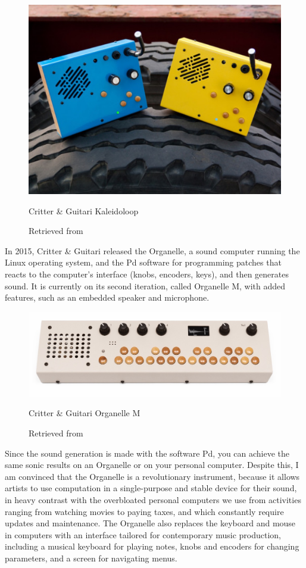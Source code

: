 \begin{figure}[ht]
  \centering
  \includegraphics[width=0.75\linewidth,height=0.25\textheight,keepaspectratio]{images/critter-and-guitari-kaleidoloop.jpg}
  \caption{Critter \& Guitari Kaleidoloop}
  \caption*{Retrieved from \cite{website-critter-and-guitari-kaleidoloop}}
  \label{fig:critter-and-guitari-kaleidoloop}
\end{figure}

In 2015, Critter \& Guitari released the Organelle, a sound computer running the Linux operating system, and the \acrfull{Pd} software for programming patches that reacts to the computer's interface (knobs, encoders, keys), and then generates sound. It is currently on its second iteration, called Organelle M, with added features, such as an embedded speaker and microphone.

\begin{figure}[ht]
  \centering
  \includegraphics[width=0.75\linewidth,height=0.25\textheight,keepaspectratio]{images/critter-and-guitari-organelle-m.jpg}
  \caption{Critter \& Guitari Organelle M}
  \caption*{Retrieved from \cite{website-critter-and-guitari-current}}
  \label{fig:critter-and-guitari-organelle-m}
\end{figure}

Since the sound generation is made with the software \acrshort{Pd}, you can achieve the same sonic results on an Organelle or on your personal computer. Despite this, I am convinced that the Organelle is a revolutionary instrument,  because it allows artists to use computation in a single-purpose and stable device for their sound, in heavy contrast with the overbloated personal computers we use from activities ranging from watching movies to paying taxes, and which constantly require updates and maintenance. The Organelle also replaces the keyboard and mouse in computers with an interface tailored for contemporary music production, including a musical keyboard for playing notes, knobs and encoders for changing parameters, and a screen for navigating menus.

